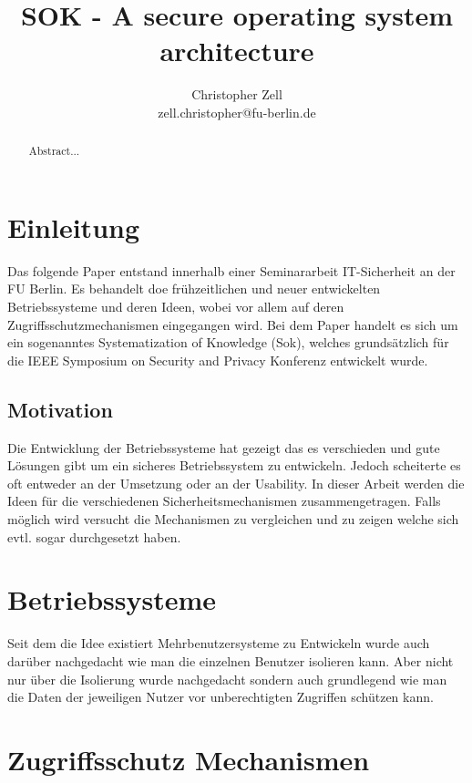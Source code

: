 \documentclass[9pt,technote]{IEEEtran}
\title{SOK - A secure operating system architecture}
\author{Christopher Zell\\
        zell.christopher@fu-berlin.de}
\begin{document}
\maketitle

  \begin{abstract}
    Abstract...
  \end{abstract}
  
  \section{Einleitung} \label{sec:intro}
    Das folgende Paper entstand innerhalb einer Seminararbeit IT-Sicherheit an der FU Berlin.
    Es behandelt doe fr\"uhzeitlichen und neuer entwickelten Betriebssysteme und deren Ideen,
    wobei vor allem auf deren Zugriffsschutzmechanismen eingegangen wird.
    Bei dem Paper handelt es sich um ein sogenanntes Systematization of Knowledge (Sok),
    welches grunds\"atzlich f\"ur die IEEE Symposium on Security and Privacy Konferenz entwickelt wurde.
    
    \subsection{Motivation}
      Die Entwicklung der Betriebssysteme hat gezeigt das es verschieden und gute L\"osungen gibt um ein sicheres Betriebssystem zu entwickeln.
      Jedoch scheiterte es oft entweder an der Umsetzung oder an der Usability. In dieser Arbeit werden die Ideen f\"ur die verschiedenen Sicherheitsmechanismen  zusammengetragen.
      Falls m\"oglich wird versucht die Mechanismen zu vergleichen und zu zeigen welche sich evtl. sogar durchgesetzt haben.
   \section{Betriebssysteme}
     Seit dem die Idee existiert Mehrbenutzersysteme zu Entwickeln wurde auch dar\"uber nachgedacht wie man die einzelnen Benutzer isolieren kann.
     Aber nicht nur \"uber die Isolierung wurde nachgedacht sondern auch grundlegend wie man die Daten der jeweiligen Nutzer vor unberechtigten Zugriffen sch\"utzen kann.
     
  \section{Zugriffsschutz Mechanismen} \label{sec:protection}
  
\end{document}
